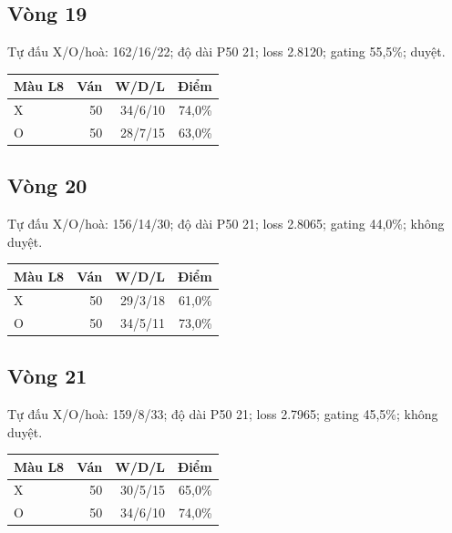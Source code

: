 \subsection*{Vòng 19}

Tự đấu X/O/hoà: 162/16/22; độ dài P50 21; loss 2.8120; gating 55,5\%; duyệt.

\begin{center}\scriptsize\begin{tabular}{@{}lrrr@{}}\toprule

Màu L8 & Ván & W/D/L & Điểm \\

\midrule

X & 50 & 34/6/10 & 74,0\% \\

O & 50 & 28/7/15 & 63,0\% \\

\bottomrule\end{tabular}\end{center}

\subsection*{Vòng 20}

Tự đấu X/O/hoà: 156/14/30; độ dài P50 21; loss 2.8065; gating 44,0\%; không duyệt.

\begin{center}\scriptsize\begin{tabular}{@{}lrrr@{}}\toprule

Màu L8 & Ván & W/D/L & Điểm \\

\midrule

X & 50 & 29/3/18 & 61,0\% \\

O & 50 & 34/5/11 & 73,0\% \\

\bottomrule\end{tabular}\end{center}

\subsection*{Vòng 21}

Tự đấu X/O/hoà: 159/8/33; độ dài P50 21; loss 2.7965; gating 45,5\%; không duyệt.

\begin{center}\scriptsize\begin{tabular}{@{}lrrr@{}}\toprule

Màu L8 & Ván & W/D/L & Điểm \\

\midrule

X & 50 & 30/5/15 & 65,0\% \\

O & 50 & 34/6/10 & 74,0\% \\

\bottomrule\end{tabular}\end{center}

